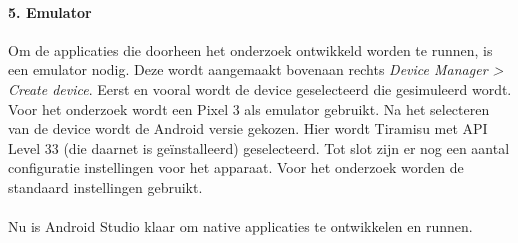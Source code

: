 \paragraph{5. Emulator}
Om de applicaties die doorheen het onderzoek ontwikkeld worden te runnen, is een emulator nodig. 
Deze wordt aangemaakt bovenaan rechts \textit{Device Manager > Create device}. 
Eerst en vooral wordt de device geselecteerd die gesimuleerd wordt. Voor het onderzoek 
wordt een Pixel 3 als emulator gebruikt. Na het selecteren van de device wordt de Android versie gekozen. 
Hier wordt Tiramisu met API Level 33 (die daarnet is geïnstalleerd) geselecteerd. 
Tot slot zijn er nog een aantal configuratie instellingen voor het apparaat. Voor het onderzoek worden 
de standaard instellingen gebruikt.
\\\\
Nu is Android Studio klaar om native applicaties te ontwikkelen en runnen. 
